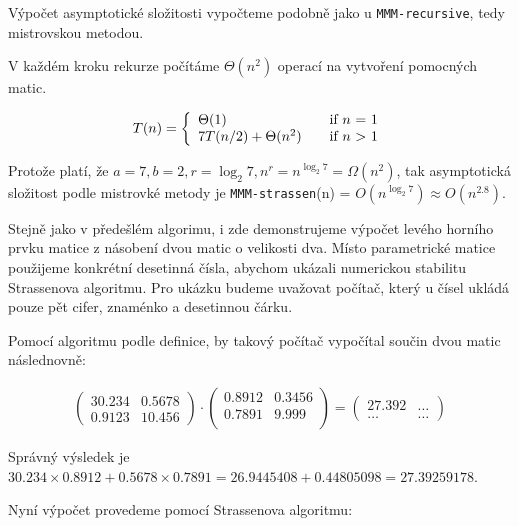 Výpočet asymptotické složitosti vypočteme podobně jako u \texttt{MMM-recursive}, tedy mistrovskou metodou. 

V každém kroku rekurze počítáme $\Theta(n^2)$ operací na vytvoření pomocných matic.

\[ T(n) = \left\{ 
  \begin{array}{l l}
    \Theta(1) & \quad \text{if $n$ = 1}\\
    7T(n/2) + \Theta(n^2) & \quad \text{if $n$ > 1}
  \end{array} \right.\]

Protože platí, že $a=7, b=2, r=\log_{2} 7, n^r=n^{\log_{2} 7}=\Omega(n^2)$, tak asymptotická složitost podle mistrovké metody je \texttt{MMM-strassen}(n) = $O(n^{\log_{2} 7}) \approx O(n^{2.8})$.

Stejně jako v předešlém algorimu, i zde demonstrujeme výpočet levého horního prvku matice z násobení dvou matic o velikosti dva. Místo parametrické matice použijeme konkrétní desetinná čísla, abychom ukázali numerickou stabilitu Strassenova algoritmu. Pro ukázku budeme uvažovat počítač, který u čísel ukládá pouze pět cifer, znaménko a desetinnou čárku.	

Pomocí algoritmu podle definice, by takový počítač vypočítal součin dvou matic následnovně:

\begin{align}
\begin{pmatrix}
 30.234 & 0.5678 \\
 0.9123 & 10.456
\end{pmatrix} \cdot \begin{pmatrix}
 0.8912 & 0.3456 \\
 0.7891 & 9.999 \\
\end{pmatrix} = \begin{pmatrix}
 27.392 & \hdots \\
 \hdots & \hdots
\end{pmatrix}
\end{align}

Správný výsledek je $30.234 \times 0.8912 + 0.5678 \times 0.7891 = 26.9445408 + 0.44805098 = 27.39259178$.

Nyní výpočet provedeme pomocí Strassenova algoritmu:

